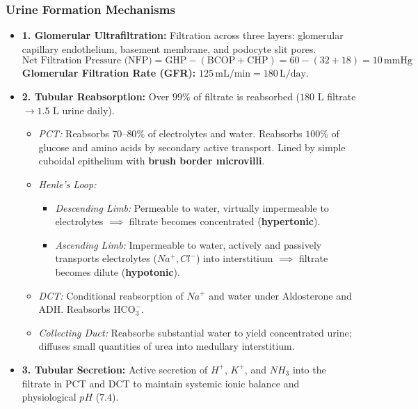 \documentclass[11pt,a4paper]{article}
\begin{document}
\subsubsection{Urine Formation Mechanisms}
\begin{itemize}[leftmargin=1.5em, itemsep=3pt]
  \item \textbf{1. Glomerular Ultrafiltration:} Filtration across three layers: glomerular capillary endothelium, basement membrane, and podocyte slit pores.
  \[
    \text{Net Filtration Pressure (NFP)} = \text{GHP} - (\text{BCOP} + \text{CHP}) = 60 - (32 + 18) = 10 \, \text{mmHg}
  \]
  \textbf{Glomerular Filtration Rate (GFR):} $125 \, \text{mL/min} = 180 \, \text{L/day}$.
  \item \textbf{2. Tubular Reabsorption:} Over $99\%$ of filtrate is reabsorbed ($180\text{ L}$ filtrate $\to 1.5\text{ L}$ urine daily).
  \begin{itemize}[label=$\circ$]
    \item \textit{PCT:} Reabsorbs $70$--$80\%$ of electrolytes and water. Reabsorbs $100\%$ of glucose and amino acids by secondary active transport. Lined by simple cuboidal epithelium with \textbf{brush border microvilli}.
    \item \textit{Henle's Loop:}
    \begin{itemize}
      \item \textit{Descending Limb:} Permeable to water, virtually impermeable to electrolytes $\implies$ filtrate becomes concentrated (\textbf{hypertonic}).
      \item \textit{Ascending Limb:} Impermeable to water, actively and passively transports electrolytes ($Na^+, Cl^-$) into interstitium $\implies$ filtrate becomes dilute (\textbf{hypotonic}).
    \end{itemize}
    \item \textit{DCT:} Conditional reabsorption of $Na^+$ and water under Aldosterone and ADH. Reabsorbs $\text{HCO}_3^-$.
    \item \textit{Collecting Duct:} Reabsorbs substantial water to yield concentrated urine; diffuses small quantities of urea into medullary interstitium.
  \end{itemize}
  \item \textbf{3. Tubular Secretion:} Active secretion of $H^+$, $K^+$, and $NH_3$ into the filtrate in PCT and DCT to maintain systemic ionic balance and physiological $pH$ ($7.4$).
\end{itemize}
\end{document}
